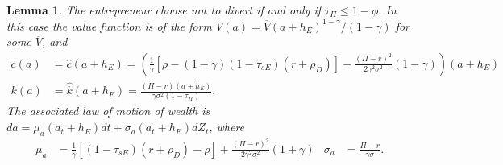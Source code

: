\documentclass[11pt]{article}
\theoremstyle{plain}
\newtheorem{lemma}[thm]{Lemma}
\theoremstyle{definition} %
\begin{document}
\begin{lemma}\label{CRRAap}
The entrepreneur choose not to divert if and only if $\tau_{\Pi} \leq 1 - \phi$. In this case the value function is of the form $V(a) = \overline{V}(a+h_E)^{1-\gamma}/(1-\gamma)$ for some $\overline{V}$, and
\begin{align*} 
c(a) & = \hat{c}(a+h_E) = {\left(\frac{1}{\gamma} [\rho -  (1-\gamma)(1-\tau_{sE})(r+\rho_D)] - \frac{(\Pi - r)^2}{2\gamma^2\sigma^2} (1-\gamma)\right)}(a+h_E)
\\ k(a) & = \hat{k}(a+h_E) = \frac{(\Pi-r)(a+h_E)}{\gamma \sigma^2(1-\tau_{\Pi})}.
\end{align*}
The associated law of motion of wealth is $da = \mu_a(a_t+h_E)dt + \sigma_a(a_t+h_E)dZ_t$, where
\begin{align*}
\mu_a & = \frac{1}{\gamma}[(1 - \tau_{sE})(r + \rho_D) - \rho] + \frac{(\Pi - r)^2}{2\gamma^2\sigma^2}(1+\gamma)  &
\sigma_a & = \frac{\Pi - r}{\gamma \sigma}.
\end{align*}
\end{lemma}
\end{document}

